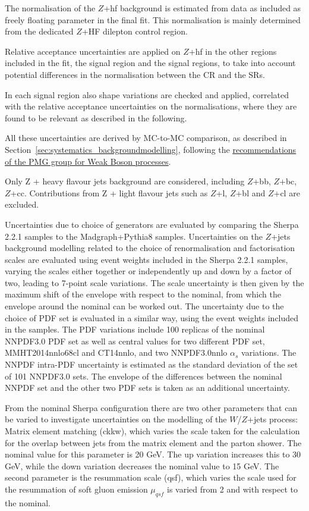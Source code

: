 The normalisation of the $Z$+hf background is estimated 
from data as included as freely floating parameter in 
the final fit. This normalisation is mainly determined 
from the dedicated $Z$+HF dilepton control region.

Relative acceptance uncertainties are applied on $Z$+hf
in the other regions included in the fit, 
the \hadhad signal region and the \lephad 
signal regions, to take into account potential differences 
in the normalisation between the CR and the SRs.
 
In each signal region also shape variations are checked 
and applied, correlated with the relative acceptance uncertainties on the normalisations, where they are found to be relevant as described in the following. 

All these uncertainties are derived by MC-to-MC comparison, 
as described in Section~\ref{sec:systematics_backgroundmodelling}, 
following the \href{https://twiki.cern.ch/twiki/bin/viewauth/AtlasProtected/PmgWeakBosonProcesses}{\underline{recommendations of the PMG group for Weak Boson processes}}. 


Only Z + heavy flavour jets background are considered, 
including $Z$+bb, $Z$+bc, $Z$+cc. 
Contributions from Z + light flavour jets 
such as $Z$+l, $Z$+bl and $Z$+cl are excluded. 

Uncertainties due to choice of generators are evaluated
by comparing the Sherpa 2.2.1 samples to the
Madgraph+Pythia8 samples. 
Uncertainties on the $Z$+jets background modelling 
related to the choice of renormalisation and factorisation 
scales are evaluated using event weights included 
in the Sherpa 2.2.1 samples, varying the scales either together 
or independently up and down by a factor of two, 
leading to 7-point scale variations. 
The scale uncertainty is then given by the maximum shift 
of the envelope with respect to the nominal, from which 
the envelope around the nominal can be worked out. 
The uncertainty due to the choice of PDF set is evaluated 
in a similar way, using the event weights included in the samples. 
The PDF variations include 100 replicas of the nominal NNPDF3.0 PDF set 
as well as central values for two different PDF set, 
MMHT2014nnlo68cl and CT14nnlo, and two NNPDF3.0nnlo $\alpha_s$ variations.  
The NNPDF intra-PDF uncertainty is estimated as the standard deviation 
of the set of 101 NNPDF3.0 sets. 
The envelope of the differences between the nominal NNPDF set 
and the other two PDF sets is taken as an additional uncertainty. 

From the nominal Sherpa configuration there are two other parameters 
that can be varied to investigate uncertainties 
on the modelling of the $W$/$Z$+jets process: 
Matrix element matching (ckkw), which varies the scale taken 
for the calculation for the overlap between jets 
from the matrix element and the parton shower. 
The nominal value for this parameter is 20 GeV. 
The up variation increases this to 30 GeV, 
while the down variation decreases the nominal value to 15 GeV. 
The second parameter is the resummation scale (qsf), 
which varies the scale used for the resummation 
of soft gluon emission $\mu_{qsf}$ is varied from 2 and with respect to the nominal. 

